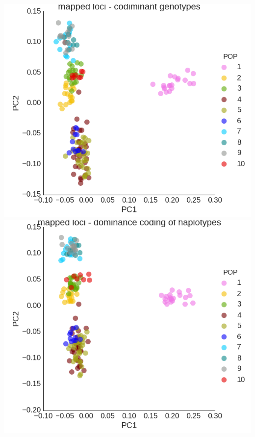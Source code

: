 \documentclass[12pt,  one column]{article}
\begin{document}
\includegraphics[scale=.3]{figures/PCA_codom.png}
\includegraphics[scale=.3]{figures/PCA_dom.png}
\end{document}
